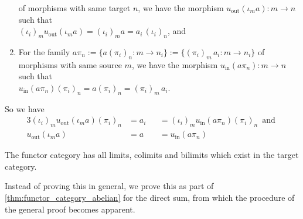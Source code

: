 \begin{example}
\begin{enumerate}
of morphisms with same target $n$, we have the morphism
$u_{\text{out}}(\iota_{m} a) : m \rightarrow n$ such that\\
$(\iota_{i})_{m} u_{\text{out}}(\iota_{m} a) = (\iota_{i})_{m} a = a_{i}\,(\iota_{i})_{n}$, and
\item For the family $a \pi_{n} := \{ a (\pi_{i})_{n} : m \rightarrow n_{i} \} := \{ (\pi_{i})_{m}\,a_{i} : m \rightarrow n_{i} \}$ of
morphisms with same source $m$, we have the morphism
$u_{\text{in}}(a \pi_{n}) : m \rightarrow n$ such that\\
$u_{\text{in}}(a \pi_{n}) (\pi_{i})_{n} = a (\pi_{i})_{n} = (\pi_{i})_{m}\,a_{i}$.
\end{enumerate}
So we have
\begin{alignat}{3}
(\iota_{i})_{m} u_{\text{out}}(\iota_{m} a) (\pi_{i})_{n} &= a_{i} &&= (\iota_{i})_{m} u_{\text{in}}(a \pi_{n}) (\pi_{i})_{n}\,
\text{ and }\\
u_{\text{out}}(\iota_{m} a) &= a &&= u_{\text{in}}(a \pi_{n})
\end{alignat}
\end{example}


\begin{theorem}
The functor category has all limits, colimits and bilimits which exist in the target category.
\end{theorem}

Instead of proving this in general, we prove this as part of \ref{thm:functor_category_abelian} for the direct sum, from which
the procedure of the general proof becomes apparent.

